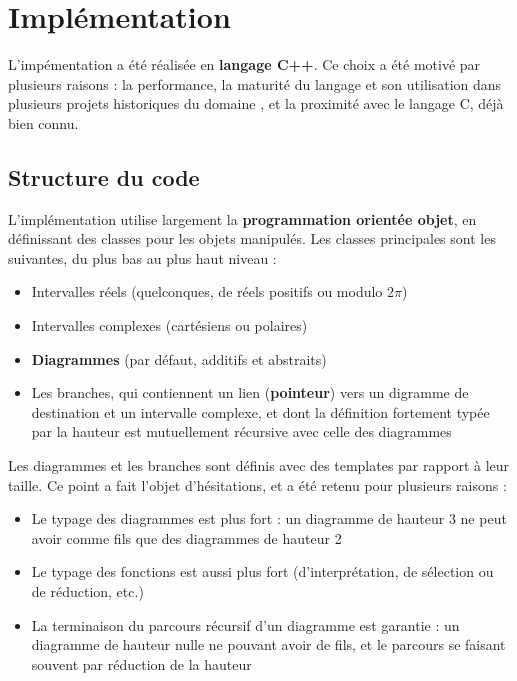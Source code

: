 \chapter{Implémentation}
\label{ch:Implementation}

L'impémentation a été réalisée en \textbf{langage C++}. Ce choix a été motivé par plusieurs raisons : la performance, la maturité du langage et son utilisation dans plusieurs projets historiques du domaine \cite{Bichsel_2023}, et la proximité avec le langage C, déjà bien connu.

\section{Structure du code}

L'implémentation utilise largement la \textbf{programmation orientée objet}, en définissant des classes pour les objets manipulés. Les classes principales sont les suivantes, du plus bas au plus haut niveau :
\begin{itemize}
  \item Intervalles réels (quelconques, de réels positifs ou modulo $2\pi$)
  \item Intervalles complexes (cartésiens ou polaires)
  \item \textbf{Diagrammes} (par défaut, additifs et abstraits)
  \item Les branches, qui contiennent un lien (\textbf{pointeur}) vers un digramme de destination et un intervalle complexe, et dont la définition fortement typée par la hauteur est mutuellement récursive avec celle des diagrammes
\end{itemize}

Les diagrammes et les branches sont définis avec des templates par rapport à leur taille. Ce point a fait l'objet d'hésitations, et a été retenu pour plusieurs raisons :
\begin{itemize}
  \item Le typage des diagrammes est plus fort : un diagramme de hauteur 3 ne peut avoir comme fils que des diagrammes de hauteur 2
  \item Le typage des fonctions est aussi plus fort (d'interprétation, de sélection ou de réduction, etc.)
  \item La terminaison du parcours récursif d'un diagramme est garantie : un diagramme de hauteur nulle ne pouvant avoir de fils, et le parcours se faisant souvent par réduction de la hauteur
\end{itemize}

